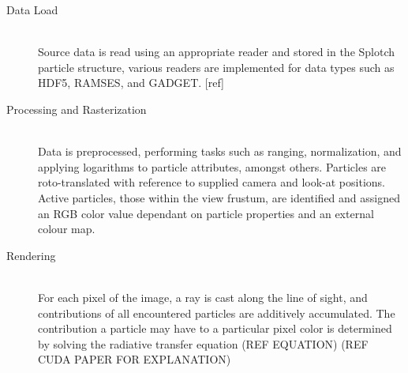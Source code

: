 \documentclass[runningheads,a4paper]{llncs}
\begin{document}
\begin{description}
  \item[Data Load] \hfill \\
  Source data is read using an appropriate reader and stored in the Splotch particle structure, various readers are 
  implemented for data types such as HDF5, RAMSES, and GADGET. [ref]
  \item[Processing and Rasterization] \hfill \\
   Data is preprocessed, performing tasks such as ranging, normalization, and applying logarithms to particle attributes, 
   amongst others. Particles are roto-translated with reference to supplied camera and look-at positions. Active particles, 
   those within the view frustum, are identified and assigned an RGB color value dependant on particle properties and an 
   external colour map.  
  \item[Rendering] \hfill \\
  For each pixel of the image, a ray is cast along the line of sight, and contributions of all encountered particles 
  are additively accumulated. The contribution a particle may have to a particular pixel color is determined by solving 
  the radiative transfer equation (REF EQUATION) (REF CUDA PAPER FOR EXPLANATION)
\end{description}




\end{document}
